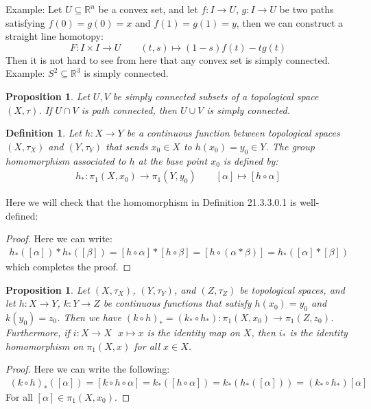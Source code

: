 \documentclass[11pt]{book}
\theoremstyle{break}
\theoremstyle{break}
\newtheorem{prop}[lem]{Proposition}
\newtheorem{defn}{Definition}[corL]
\newcommand{\R}{\mathbb{R}}
\newcommand{\example}{\color{green}Example: \color{black}}
\begin{document}
\example Let $U \subseteq \R^n$ be a convex set, and let $f:I \to U$, $g:I \to U$ be two paths satisfying $f(0) = g(0) = x$ and $f(1) = g(1) = y$, then we can construct a straight line homotopy: 
$$F: I \times I \to U\qquad (t,s)\mapsto (1-s) f(t) - tg(t)$$
Then it is not hard to see from here that any convex set is simply connected.\\

\example $S^2 \subseteq \R^3$ is simply connected.

\begin{prop}
Let $U,V$ be simply connected subsets of a topological space $(X,\tau)$. If $U\cap V$ is path connected, then $U \cup V$ is simply connected. 
\end{prop}

\begin{defn}
Let $h:X\to Y$ be a continuous function between topological spaces $(X,\tau_X)$ and $(Y,\tau_Y)$ that sends $x_0 \in X$ to $h(x_0) = y_0 \in Y$. The group homomorphism associated to $h$ at the base point $x_0$ is defined by:
\begin{align*}
h_* : \pi_1(X,x_0) \to \pi_1(Y,y_0) \qquad [\alpha] \mapsto [h\circ \alpha]
\end{align*}
\end{defn}
Here we will check that the homomorphism in Definition 21.3.3.0.1 is well-defined:
\begin{proof}
Here we can write:
\begin{align*}
h_*([\alpha]) * h_*([\beta]) = [h\circ \alpha] * [h\circ \beta] = [h\circ (\alpha*\beta)] = h_*([\alpha]*[\beta])
\end{align*}
which completes the proof. 
\end{proof}

\begin{prop}
Let $(X,\tau_X)$, $(Y,\tau_Y)$, and $(Z,\tau_Z)$ be topological spaces, and let $h:X \to Y$, $k:Y \to Z$ be continuous functions that satisfy $h(x_0) = y_0 $ and $k(y_0) = z_0$. Then we have $(k\circ h)_* = (k_*\circ h_*): \pi_1 (X,x_0) \to \pi_1(Z,z_0)$.  Furthermore, if $i:X \to X \ \ \ x\mapsto x$ is the identity map on $X$, then $i_*$ is the identity homomorphism on $\pi_1(X,x)$ for all $x \in X$.
\end{prop}
\begin{proof}
Here we can write the following:
\begin{align*}
(k\circ h)_*([\alpha]) = [k\circ h\circ \alpha] = k_*([h\circ \alpha]) = k_*(h_*([\alpha])) = (k_*\circ h_*)[\alpha]
\end{align*}
For all $[\alpha]\in \pi_1(X,x_0)$. 
\end{proof}
\end{document}
